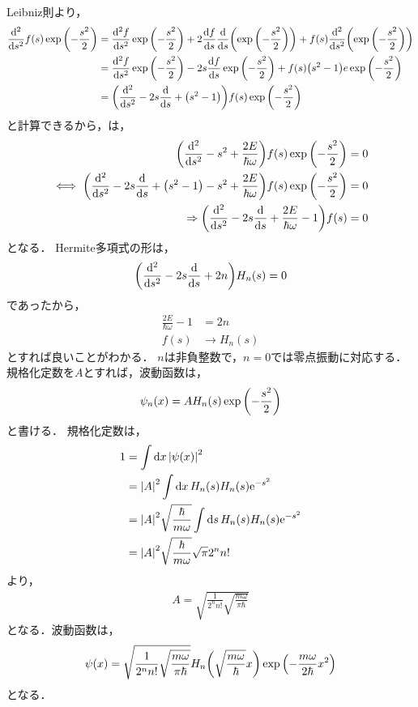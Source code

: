 \documentclass{report}
\begin{document}
    Leibniz則より，
    \begin{align}
      \dv[2]{s}f(s)\exp\qty(-\frac{s^2}{2}) &= \dv[2]{f}{s}\exp\qty(-\frac{s^2}{2}) + 2\dv{f}{s}\dv{s}\qty(\exp\qty(-\frac{s^2}{2})) + f(s)\dv[2]{s}\qty(\exp\qty(-\frac{s^2}{2})) \\ 
      &= \dv[2]{f}{s}\exp\qty(-\frac{s^2}{2}) - 2s\dv{f}{s}\exp\qty(-\frac{s^2}{2}) + f(s)\qty(s^2 - 1)e\exp\qty(-\frac{s^2}{2}) \\ 
      &= \qty(\dv[2]{s} - 2s\dv{s} + \qty(s^2 - 1))f(s)\exp\qty(-\frac{s^2}{2})
    \end{align}
    と計算できるから，は，
    \begin{align}
      \qty(\dv[2]{s} - s^2 + \frac{2E}{\hbar\omega})f(s)\exp\qty(-\frac{s^2}{2}) &= 0 \\ 
      \iff \qty(\dv[2]{s} - 2s\dv{s} + \qty(s^2 - 1) - s^2 + \frac{2E}{\hbar\omega})f(s)\exp\qty(-\frac{s^2}{2}) &= 0 \\ 
      \Rightarrow \qty(\dv[2]{s} - 2s\dv{s} + \frac{2E}{\hbar\omega} - 1)f(s) &= 0
    \end{align}
    となる．
    Hermite多項式の形は，
    \begin{align}
      \qty(\dv[2]{s} - 2s\dv{s} + 2n)H_n(s) = 0
    \end{align}
    であったから，
    \begin{align}
      \frac{2E}{\hbar\omega} - 1 &= 2n \\ 
      f(s) &\to H_n(s)
    \end{align}
    とすれば良いことがわかる．
    $n$は非負整数で，$n = 0$では零点振動に対応する．
    規格化定数を$A$とすれば，波動函数は，
    \begin{align}
      \psi_n(x) = AH_n(s)\exp\qty(-\frac{s^2}{2})
    \end{align}
    と書ける．
    規格化定数は，
    \begin{align}
      1 &= \int\dd{x}\abs{\psi(x)}^2 \\ 
      &= \abs{A}^2\int\dd{x}H_n(s)H_n(s)\mathrm{e}^{-s^2} \\ 
      &= \abs{A}^2\sqrt{\frac{\hbar}{m\omega}}\int\dd{s}H_n(s)H_n(s)\mathrm{e}^{-s^2} \\ 
      &= \abs{A}^2\sqrt{\frac{\hbar}{m\omega}}\sqrt{\pi}2^nn! 
    \end{align}
    より，
    \begin{align}
      A = \sqrt{\frac{1}{2^nn!}\sqrt{\frac{m\omega}{\pi\hbar}}}
    \end{align}
    となる．波動函数は，
    \begin{align}
      \psi(x) = \sqrt{\frac{1}{2^nn!}\sqrt{\frac{m\omega}{\pi\hbar}}}H_n\qty(\sqrt{\frac{m\omega}{\hbar}}x)\exp\qty(-\frac{m\omega}{2\hbar}x^2)
    \end{align}
    となる．
\end{document}
